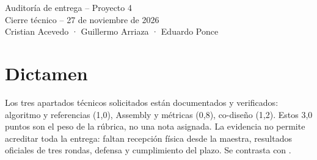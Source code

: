 \documentclass[11pt,a4paper]{article}
\begin{document}
\begin{center}{\LARGE Auditoría de entrega -- Proyecto 4}\\[6pt]
{\large Cierre técnico -- 27 de noviembre de 2026}\\[6pt]
Cristian Acevedo · Guillermo Arriaza · Eduardo Ponce\end{center}

\section*{Dictamen}
Los tres apartados técnicos solicitados están documentados y verificados:
algoritmo y referencias (1,0), Assembly y métricas (0,8), co-diseño (1,2).
Estos 3,0 puntos son el peso de la rúbrica, no una nota asignada.
La evidencia no permite acreditar toda la entrega: faltan recepción física
desde la maestra, resultados oficiales de tres rondas, defensa y cumplimiento
del plazo. Se contrasta con .
\end{document}
